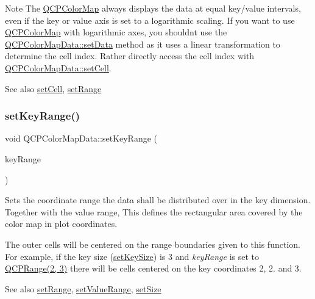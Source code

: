 \begin{DoxyNote}{Note}
The \hyperlink{classQCPColorMap}{Q\+C\+P\+Color\+Map} always displays the data at equal key/value intervals, even if the key or value axis is set to a logarithmic scaling. If you want to use \hyperlink{classQCPColorMap}{Q\+C\+P\+Color\+Map} with logarithmic axes, you shouldn\textquotesingle{}t use the \hyperlink{classQCPColorMapData_afd2083ccfd6987ec94aa7ef8e91ca39a}{Q\+C\+P\+Color\+Map\+Data\+::set\+Data} method as it uses a linear transformation to determine the cell index. Rather directly access the cell index with \hyperlink{classQCPColorMapData_a8e75eaf8746596319032a93f3d2d0683}{Q\+C\+P\+Color\+Map\+Data\+::set\+Cell}.
\end{DoxyNote}
\begin{DoxySeeAlso}{See also}
\hyperlink{classQCPColorMapData_a8e75eaf8746596319032a93f3d2d0683}{set\+Cell}, \hyperlink{classQCPColorMapData_aad9c1c7c703c1339489fc730517c83d4}{set\+Range} 
\end{DoxySeeAlso}
\mbox{\label{classQCPColorMapData_a0738c485f3c9df9ea1241b7a8bb6a86e}} 
\subsubsection{\texorpdfstring{set\+Key\+Range()}{setKeyRange()}}
{\footnotesize\ttfamily void Q\+C\+P\+Color\+Map\+Data\+::set\+Key\+Range (\begin{DoxyParamCaption}\item[{const \hyperlink{classQCPRange}{Q\+C\+P\+Range} \&}]{key\+Range }\end{DoxyParamCaption})}

Sets the coordinate range the data shall be distributed over in the key dimension. Together with the value range, This defines the rectangular area covered by the color map in plot coordinates.

The outer cells will be centered on the range boundaries given to this function. For example, if the key size (\hyperlink{classQCPColorMapData_ac7ef70e383aface34b44dbde49234b6b}{set\+Key\+Size}) is 3 and {\itshape key\+Range} is set to {\ttfamily \hyperlink{classQCPRange}{Q\+C\+P\+Range(2, 3)}} there will be cells centered on the key coordinates 2, 2. and 3.

\begin{DoxySeeAlso}{See also}
\hyperlink{classQCPColorMapData_aad9c1c7c703c1339489fc730517c83d4}{set\+Range}, \hyperlink{classQCPColorMapData_ada1b2680ba96a5f4175b6d341cf75d23}{set\+Value\+Range}, \hyperlink{classQCPColorMapData_a0d9ff35c299d0478b682bfbcdd9c097e}{set\+Size} 
\end{DoxySeeAlso}
\mbox{\label{classQCPColorMapData_ac7ef70e383aface34b44dbde49234b6b}} 
